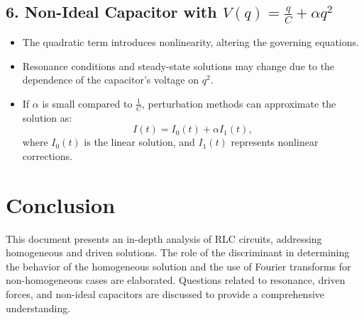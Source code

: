 \documentclass[a4paper,11pt]{article}
\begin{document}
\subsection*{6. Non-Ideal Capacitor with \(V(q) = \frac{q}{C} + \alpha q^2\)}
\begin{itemize}
    \item The quadratic term introduces nonlinearity, altering the governing equations.
    \item Resonance conditions and steady-state solutions may change due to the dependence of the capacitor's voltage on \(q^2\).
    \item If \(\alpha\) is small compared to \(\frac{1}{C}\), perturbation methods can approximate the solution as:
    \[
    I(t) = I_0(t) + \alpha I_1(t),
    \]
    where \(I_0(t)\) is the linear solution, and \(I_1(t)\) represents nonlinear corrections.
\end{itemize}

\section*{Conclusion}
This document presents an in-depth analysis of RLC circuits, addressing homogeneous and driven solutions. The role of the discriminant in determining the behavior of the homogeneous solution and the use of Fourier transforms for non-homogeneous cases are elaborated. Questions related to resonance, driven forces, and non-ideal capacitors are discussed to provide a comprehensive understanding.
\end{document}
